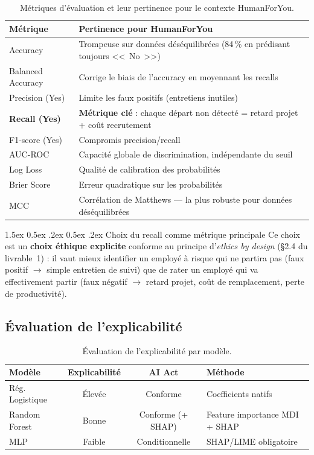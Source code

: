\documentclass[12pt,a4paper]{article}
\makeatletter
\renewcommand\paragraph{\@startsection{paragraph}{4}{\z@}%
  {1.5ex \@plus 0.5ex \@minus .2ex}%
  {0.5ex \@plus .2ex}%
  {\normalfont\normalsize\bfseries}}
\makeatother
\begin{document}
\begin{table}[ht]
\centering
\begin{tabularx}{\textwidth}{lX}
\toprule
\textbf{Métrique} & \textbf{Pertinence pour HumanForYou} \\
\midrule
Accuracy & Trompeuse sur données déséquilibrées (84\,\% en prédisant toujours <<~No~>>) \\
Balanced Accuracy & Corrige le biais de l'accuracy en moyennant les recalls \\
Precision (Yes) & Limite les faux positifs (entretiens inutiles) \\
\textbf{Recall (Yes)} & \textbf{Métrique clé} : chaque départ non détecté = retard projet + coût recrutement \\
F1-score (Yes) & Compromis precision/recall \\
AUC-ROC & Capacité globale de discrimination, indépendante du seuil \\
Log Loss & Qualité de calibration des probabilités \\
Brier Score & Erreur quadratique sur les probabilités \\
MCC & Corrélation de Matthews --- la plus robuste pour données déséquilibrées \\
\bottomrule
\end{tabularx}
\caption{Métriques d'évaluation et leur pertinence pour le contexte HumanForYou.}
\end{table}

\paragraph{Choix du recall comme métrique principale} Ce choix est un \textbf{choix éthique explicite} conforme au principe d'\textit{ethics by design} (§2.4 du livrable~1) : il vaut mieux identifier un employé à risque qui ne partira pas (faux positif $\rightarrow$ simple entretien de suivi) que de rater un employé qui va effectivement partir (faux négatif $\rightarrow$ retard projet, coût de remplacement, perte de productivité).

\subsection{Évaluation de l'explicabilité}

\begin{table}[ht]
\centering
\begin{tabularx}{\textwidth}{lccX}
\toprule
\textbf{Modèle} & \textbf{Explicabilité} & \textbf{AI Act} & \textbf{Méthode} \\
\midrule
Rég. Logistique & Élevée & Conforme & Coefficients natifs \\
Random Forest & Bonne & Conforme (+ SHAP) & Feature importance MDI + SHAP \\
MLP & Faible & Conditionnelle & SHAP/LIME obligatoire \\
\bottomrule
\end{tabularx}
\caption{Évaluation de l'explicabilité par modèle.}
\end{table}
\end{document}
